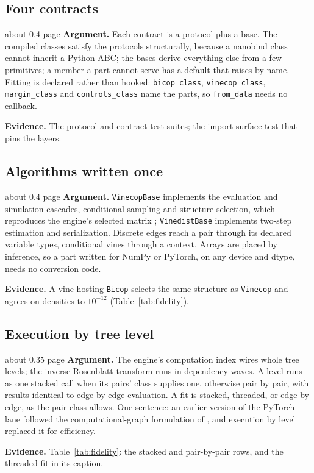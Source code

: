 \documentclass[twoside,11pt]{article}
\begin{document}
\subsection{Four contracts}

\begin{plan}{about 0.4 page}
\textbf{Argument.} Each contract is a protocol plus a base. The compiled
classes satisfy the protocols structurally, because a nanobind class cannot
inherit a Python ABC; the bases derive everything else from a few primitives;
a member a part cannot serve has a default that raises by name. Fitting is
declared rather than hooked: \texttt{bicop\_class}, \texttt{vinecop\_class},
\texttt{margin\_class} and \texttt{controls\_class} name the parts, so
\texttt{from\_data} needs no callback.

\textbf{Evidence.} The protocol and contract test suites; the import-surface
test that pins the layers.
\end{plan}

\subsection{Algorithms written once}

\begin{plan}{about 0.4 page}
\textbf{Argument.} \texttt{VinecopBase} implements the evaluation and
simulation cascades, conditional sampling and structure selection, which
reproduces the engine's selected matrix \citep{dissmann2013selecting};
\texttt{VinedistBase} implements two-step estimation and serialization.
Discrete edges reach a pair through its declared variable types, conditional
vines through a context. Arrays are placed by inference, so a part written for
NumPy or PyTorch, on any device and dtype, needs no conversion code.

\textbf{Evidence.} A vine hosting \texttt{Bicop} selects the same structure
as \texttt{Vinecop} and agrees on densities to $10^{-12}$
(Table~\ref{tab:fidelity}).
\end{plan}

\subsection{Execution by tree level}

\begin{plan}{about 0.35 page}
\textbf{Argument.} The engine's computation index
\citep[Section~3.1]{nagler2026rvinecopulib} wires whole tree levels; the
inverse Rosenblatt transform runs in dependency waves. A level runs as one
stacked call when its pairs' class supplies one, otherwise pair by pair, with
results identical to edge-by-edge evaluation. A fit is stacked, threaded, or
edge by edge, as the pair class allows. One sentence: an earlier version of the
PyTorch lane followed the computational-graph formulation of
\citet{cheng2025vine}, and execution by level replaced it for efficiency.

\textbf{Evidence.} Table~\ref{tab:fidelity}: the stacked and pair-by-pair rows, and the threaded fit in its caption.
\end{plan}
\end{document}
